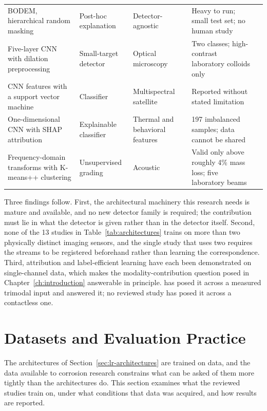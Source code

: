\begin{xltabular}{\textwidth}{@{}X p{2.2cm} p{2.4cm} X l@{}}
BODEM, hierarchical random masking & Post-hoc explanation & Detector-agnostic & Heavy to run; small test set; no human study & \citep{Moradi2024} \\
Five-layer CNN with dilation preprocessing & Small-target detector & Optical microscopy & Two classes; high-contrast laboratory colloids only & \citep{Mirzaei2025} \\
CNN features with a support vector machine & Classifier & Multispectral satellite & Reported without stated limitation & \citep{Hafdaoui2026} \\
One-dimensional CNN with SHAP attribution & Explainable classifier & Thermal and behavioral features & 197 imbalanced samples; data cannot be shared & \citep{Persiya2025} \\
Frequency-domain transforms with K-means++ clustering & Unsupervised grading & Acoustic & Valid only above roughly 4\% mass loss; five laboratory beams & \citep{Phannakham2026} \\
\end{xltabular}
\endgroup

Three findings follow. First, the architectural machinery this research needs is
mature and available, and no new detector family is required; the contribution
must lie in what the detector is given rather than in the detector itself.
Second, none of the 13 studies in Table~\ref{tab:architectures} trains on more
than two physically distinct imaging sensors, and the single study that uses two
\citep{Zhang2026b} requires the streams to be registered beforehand rather than learning the
correspondence. Third, attribution \citep{Moradi2024,Persiya2025} and label-efficient learning
\citep{Phannakham2026} have each been demonstrated on single-channel data, which makes the
modality-contribution question posed in Chapter~\ref{ch:introduction}
answerable in principle. \citet{Ding2025} has posed it across a measured
trimodal input and answered it; no reviewed study has posed it across a
contactless one.

\section{Datasets and Evaluation Practice}
\label{sec:lr-datasets}

The architectures of Section~\ref{sec:lr-architectures} are trained on data, and
the data available to corrosion research constrains what can be asked of them
more tightly than the architectures do. This section examines what the reviewed
studies train on, under what conditions that data was acquired, and how results
are reported.

